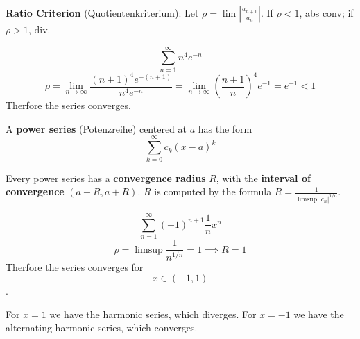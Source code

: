 \begin{theorem}
    \textbf{Ratio Criterion} (Quotientenkriterium): Let $\rho = \lim \left| \frac{a_{n+1}}{a_n} \right|$. If $\rho \lt 1$, abs conv; if $\rho \gt 1$, div.
\end{theorem}

\begin{example}
    $$\sum_{n=1}^\infty n^4 e^{-n}$$
    $$\rho = \lim_{n \to \infty} \frac{(n+1)^4 e^{-(n+1)}}{n^4 e^{-n}} = \lim_{n \to \infty} \left( \frac{n+1}{n} \right)^4 e^{-1} = e^{-1} \lt 1$$
    Therfore the series converges.
\end{example}

\begin{definition}
    A \textbf{power series} (Potenzreihe) centered at $a$ has the form 
    $$\sum_{k=0}^\infty c_k(x-a)^k$$
\end{definition}

\begin{theorem}
    Every power series has a \textbf{convergence radius} $R$, with the \textbf{interval of convergence} $(a-R, a+R)$. $R$ is computed by the formula $R = \frac{1}{\limsup |c_n|^{1/n}}$.
\end{theorem}

\begin{example}
    $$\sum_{n=1}^\infty (-1)^{n+1} \frac{1}{n}x^n$$
    $$\rho = \limsup \frac{1}{n^{1/n}} = 1 \implies R = 1$$
    Therfore the series converges for $$x \in (-1, 1)$$.
\end{example}

\begin{remark}
    For $x = 1$ we have the harmonic series, which diverges.
    For $x = -1$ we have the alternating harmonic series, which converges.
\end{remark}
